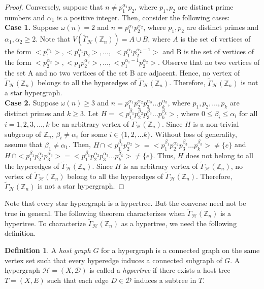 \documentclass[11pt,a4paper]{article}
\theoremstyle{definition}
\newtheorem{defn}{Definition}[section]
\theoremstyle{remark}
\begin{document}
\begin{proof}
	\noindent Conversely, suppose that  $n \neq p_1^{\alpha_1} p_2$, where $p_1,p_2$ are distinct prime numbers and $\alpha_1$ is a positive integer. Then, consider the following cases:\\
	\textbf{Case 1.} Suppose $\omega(n)= 2$ and  $n=p_1^{\alpha_1} p_2^{\alpha_2}$, where $p_1,p_2$ are distinct primes and $\alpha_1, \alpha_2 \geq 2$. Note that $V(\tilde{\Gamma}_\mathcal{H}(\mathbb{Z}_n))=A \cup B$, where 
	$A$ is the set of  vertices of the form $<p_1^{\alpha_1}>, <p_1^{\alpha_1}p_2>, \ldots,$ $<p_1^{\alpha_1}p_2^{\alpha_2-1}>$ and  B is the set of vertices of the form $<p_2^{\alpha_2}>, <p_1 p_2^{\alpha_2}>,\ldots, <p_1^{\alpha_1-1}p_2^{\alpha_2}>$. Observe that no two vertices of the set A  and no two vertices of the set B are adjacent. Hence, no vertex of $\tilde{\Gamma}_\mathcal{H}(\mathbb{Z}_n)$ belongs to all the hyperedges of $\tilde{\Gamma}_\mathcal{H}(\mathbb{Z}_n)$. Therefore, $\tilde{\Gamma}_\mathcal{H}(\mathbb{Z}_n)$ is not a star hypergraph.\\
		\textbf{Case 2.} Suppose $\omega(n) \geq 3$ and   $n=p_1^{\alpha_1}p_2^{\alpha_2}p_3^{\alpha_3}\ldots p_k^{\alpha_k}$, where $p_1,p_2, \ldots, p_k$ are distinct primes and $k\geq 3$. Let $H=<p_1^{\beta_1}p_2^{\beta_2}p_3^{\beta_3}\ldots p_k^{\beta_k}>$, where $0 \leq \beta_i \leq \alpha_i$ for all $i=1,2,3, \ldots, k$ be an arbitrary vertex of $\tilde{\Gamma}_\mathcal{H}(\mathbb{Z}_n)$. Since $H$ is a non-trivial subgroup of $\mathbb{Z}_n$,   $\beta_i \neq \alpha_i$ for some $i \in \{1,2, \ldots k\}$.	Without loss of generality, assume that $\beta_1 \neq \alpha_1$. Then, $ H \, \cap <p_1^{\beta_1}p_2^{\alpha_2}> = <p_1^{\beta_1}p_2^{\alpha_2}p_3^{\beta_3}\ldots p_k^{\beta_k}>\neq \{e\}$ and $ H \, \cap <p_1^{\beta_1}p_2^{\alpha_2}p_3^{\alpha_3}> = <p_1^{\beta_1}p_2^{\alpha_2}p_3^{\alpha_3}\ldots p_k^{\beta_k}> \neq \{e\}$. Thus, $H$ does not belong to all the hyperedges of $\tilde{\Gamma}_\mathcal{H}(\mathbb{Z}_n)$. Since $H$ is an arbitrary vertex of $\tilde{\Gamma}_\mathcal{H}(\mathbb{Z}_n)$, no vertex of $\tilde{\Gamma}_\mathcal{H}(\mathbb{Z}_n)$ belong to all the hyperedges of $\tilde{\Gamma}_\mathcal{H}(\mathbb{Z}_n)$. Therefore, $\tilde{\Gamma}_\mathcal{H}(\mathbb{Z}_n)$ is not a star hypergraph.
		\end{proof}
	
		\noindent Note that every star hypergraph is a hypertree. But the converse need not be true in general. The following theorem characterizes when 	$\tilde{\Gamma}_\mathcal{H}(\mathbb{Z}_n)$ is a hypertree. To characterize 	$\tilde{\Gamma}_\mathcal{H}(\mathbb{Z}_n)$ as a hypertree, we need the following definition.
		\begin{defn}\cite{voloshinhypergraphs}
			A \textit{host graph} $G$ for a hypergraph is a connected graph on the same vertex set such that
			every hyperedge induces a connected subgraph of $G$. A hypergraph $\mathcal{H} = (X,\mathcal{D})$ is called a \textit{hypertree} if there exists a host tree
			$T = (X,E)$ such that each edge $D \in \mathcal{D}$  induces a subtree in $T$. 
		\end{defn}
		
\end{document}
